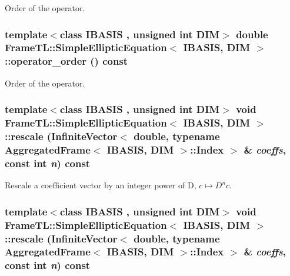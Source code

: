 Order of the operator. \hypertarget{classFrameTL_1_1SimpleEllipticEquation_b630525bc26c31fd7fd241c2d31fd4c8}{
\subsubsection[{operator\_\-order}]{\setlength{\rightskip}{0pt plus 5cm}template$<$class IBASIS , unsigned int DIM$>$ double {\bf FrameTL::SimpleEllipticEquation}$<$ IBASIS, DIM $>$::operator\_\-order () const}}
\label{classFrameTL_1_1SimpleEllipticEquation_b630525bc26c31fd7fd241c2d31fd4c8}


Order of the operator. \hypertarget{classFrameTL_1_1SimpleEllipticEquation_df7e344f9567c74f5c6e34c3b6942937}{
\subsubsection[{rescale}]{\setlength{\rightskip}{0pt plus 5cm}template$<$class IBASIS , unsigned int DIM$>$ void {\bf FrameTL::SimpleEllipticEquation}$<$ IBASIS, DIM $>$::rescale (InfiniteVector$<$ double, typename {\bf AggregatedFrame}$<$ IBASIS, DIM $>$::{\bf Index} $>$ \& {\em coeffs}, \/  const int {\em n}) const}}
\label{classFrameTL_1_1SimpleEllipticEquation_df7e344f9567c74f5c6e34c3b6942937}


Rescale a coefficient vector by an integer power of D, $c \mapsto D^{n}c$. \hypertarget{classFrameTL_1_1SimpleEllipticEquation_df7e344f9567c74f5c6e34c3b6942937}{
\subsubsection[{rescale}]{\setlength{\rightskip}{0pt plus 5cm}template$<$class IBASIS , unsigned int DIM$>$ void {\bf FrameTL::SimpleEllipticEquation}$<$ IBASIS, DIM $>$::rescale (InfiniteVector$<$ double, typename {\bf AggregatedFrame}$<$ IBASIS, DIM $>$::{\bf Index} $>$ \& {\em coeffs}, \/  const int {\em n}) const}}
\label{classFrameTL_1_1SimpleEllipticEquation_df7e344f9567c74f5c6e34c3b6942937}


